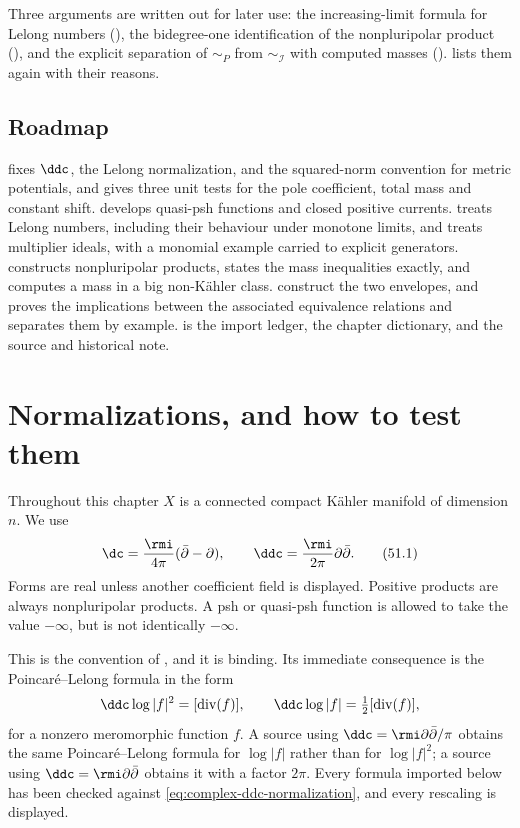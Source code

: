 Three arguments are written out for later use: the increasing-limit formula
for Lelong numbers (), the bidegree-one
identification of the nonpluripolar product
(), and the explicit separation of
$\sim_P$ from $\sim_{\mathcal I}$ with computed masses
().   lists them again with
their reasons.

\subsection{Roadmap}
\label{sec:ch51-roadmap}

 fixes $\ddc$, the Lelong normalization,
and the squared-norm convention for metric potentials, and gives three
unit tests for the pole coefficient, total mass and constant shift.
 develops quasi-psh functions and closed positive
currents.   treats Lelong numbers, including their
behaviour under monotone limits, and
 treats multiplier ideals, with a monomial
example carried to explicit generators.   constructs
nonpluripolar products, states the mass inequalities exactly, and computes
a mass in a big non-K\"ahler class.   construct the two envelopes, and
 proves the implications between the associated
equivalence relations and separates them by example.
 is the import ledger,
 the chapter dictionary, and
 the source and historical note.

\section{Normalizations, and how to test them}
\label{sec:ch51-normalizations}

Throughout this chapter $X$ is a connected compact K\"ahler manifold of
dimension $n$.  We use
\[
             \dc=\frac{\rmi}{4\pi}(\bar\partial-\partial),
             \qquad
             \ddc=\frac{\rmi}{2\pi}\partial\bar\partial .
\tag{51.1}\label{eq:complex-ddc-normalization}
\]
Forms are real unless another coefficient field is displayed.
Positive products are always nonpluripolar products.  A psh or
quasi-psh function is allowed to take the value $-\infty$, but is not
identically $-\infty$.

This is the convention of , and it is binding.
Its immediate consequence is the Poincar\'e--Lelong formula in the form
\[
 \ddc\log|f|^2=[\operatorname{div}(f)],
 \qquad
 \ddc\log|f|=\tfrac12[\operatorname{div}(f)],
\]
for a nonzero meromorphic function $f$.  A source using
$\ddc=\rmi\partial\bar\partial/\pi$ obtains the same Poincar\'e--Lelong
formula for $\log|f|$ rather than for $\log|f|^2$; a source using
$\ddc=\rmi\partial\bar\partial$ obtains it with a factor $2\pi$.
Every formula imported below has been checked against
\eqref{eq:complex-ddc-normalization}, and every rescaling is displayed.

